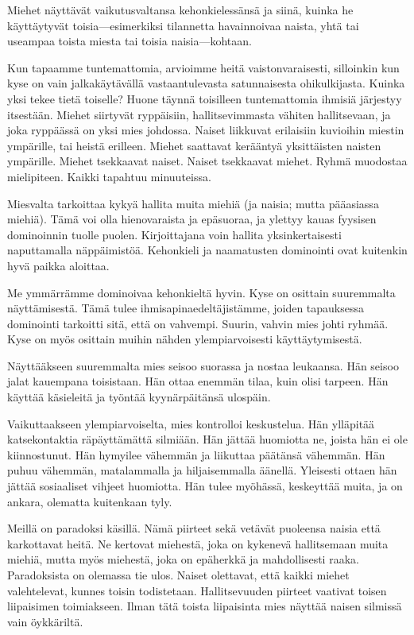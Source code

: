 Miehet näyttävät vaikutusvaltansa kehonkielessänsä ja siinä, kuinka he käyttäytyvät toisia---esimerkiksi tilannetta havainnoivaa naista, yhtä tai useampaa toista miesta tai toisia naisia---kohtaan.

Kun tapaamme tuntemattomia, arvioimme heitä vaistonvaraisesti, silloinkin kun kyse on vain jalkakäytävällä vastaantulevasta satunnaisesta ohikulkijasta. Kuinka yksi tekee tietä toiselle? Huone täynnä toisilleen tuntemattomia ihmisiä järjestyy itsestään. Miehet siirtyvät ryppäisiin, hallitsevimmasta vähiten hallitsevaan, ja joka ryppäässä on yksi mies johdossa. Naiset liikkuvat erilaisiin kuvioihin miestin ympärille, tai heistä erilleen. Miehet saattavat kerääntyä yksittäisten naisten ympärille. Miehet tsekkaavat naiset. Naiset tsekkaavat miehet. Ryhmä muodostaa mielipiteen. Kaikki tapahtuu minuuteissa.

Miesvalta tarkoittaa kykyä hallita muita miehiä (ja naisia; mutta pääasiassa miehiä). Tämä voi olla hienovaraista ja epäsuoraa, ja ylettyy kauas fyysisen dominoinnin tuolle puolen. Kirjoittajana voin hallita yksinkertaisesti naputtamalla näppäimistöä. Kehonkieli ja naamatusten dominointi ovat kuitenkin hyvä paikka aloittaa.

Me ymmärrämme dominoivaa kehonkieltä hyvin. Kyse on osittain suuremmalta näyttämisestä. Tämä tulee ihmisapinaedeltäjistämme, joiden tapauksessa dominointi tarkoitti sitä, että on vahvempi. Suurin, vahvin mies johti ryhmää. Kyse on myös osittain muihin nähden ylempiarvoisesti käyttäytymisestä.

Näyttääkseen suuremmalta mies seisoo suorassa ja nostaa leukaansa. Hän seisoo jalat kauempana toisistaan. Hän ottaa enemmän tilaa, kuin olisi tarpeen. Hän käyttää käsieleitä ja työntää kyynärpäitänsä ulospäin.

Vaikuttaakseen ylempiarvoiselta, mies kontrolloi keskustelua. Hän ylläpitää katsekontaktia räpäyttämättä silmiään. Hän jättää huomiotta ne, joista hän ei ole kiinnostunut. Hän hymyilee vähemmän ja liikuttaa päätänsä vähemmän. Hän puhuu vähemmän, matalammalla ja hiljaisemmalla äänellä. Yleisesti ottaen hän jättää sosiaaliset vihjeet huomiotta. Hän tulee myöhässä, keskeyttää muita, ja on ankara, olematta kuitenkaan tyly.

Meillä on paradoksi käsillä. Nämä piirteet sekä vetävät puoleensa naisia että karkottavat heitä. Ne kertovat miehestä, joka on kykenevä hallitsemaan muita miehiä, mutta myös miehestä, joka on epäherkkä ja mahdollisesti raaka. Paradoksista on olemassa tie ulos. Naiset olettavat, että kaikki miehet valehtelevat, kunnes toisin todistetaan. Hallitsevuuden piirteet vaativat toisen liipaisimen toimiakseen. Ilman tätä toista liipaisinta mies näyttää naisen silmissä vain öykkäriltä.

